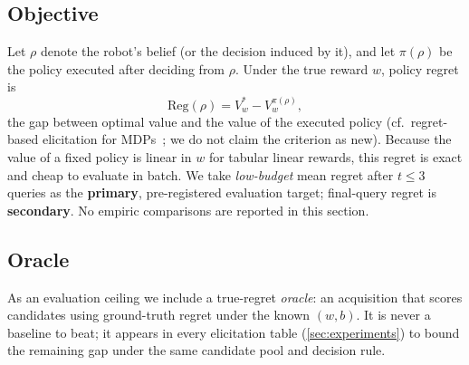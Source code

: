 \subsection{Objective}
\label{sec:objective}
Let $\rho$ denote the robot's belief (or the decision induced by it), and let
$\pi(\rho)$ be the policy executed after deciding from $\rho$.
Under the true reward $w$, policy regret is
\begin{equation}
  \mathrm{Reg}(\rho)=V^{*}_{w}-V^{\pi(\rho)}_{w},
\end{equation}
the gap between optimal value and the value of the executed policy
(cf.\ regret-based elicitation for MDPs~\citep{regan2009regret}; we do not claim
the criterion as new).
Because the value of a fixed policy is linear in $w$ for tabular linear rewards,
this regret is exact and cheap to evaluate in batch.
We take \emph{low-budget} mean regret after $t\le 3$ queries as the
\textbf{primary}, pre-registered evaluation target; final-query regret is
\textbf{secondary}.
No empiric comparisons are reported in this section.

\subsection{Oracle}
\label{sec:oracle}
As an evaluation ceiling we include a true-regret \emph{oracle}: an acquisition
that scores candidates using ground-truth regret under the known $(w,b)$.
It is never a baseline to beat; it appears in every elicitation table
(\cref{sec:experiments}) to bound the remaining gap under the same candidate pool
and decision rule.
